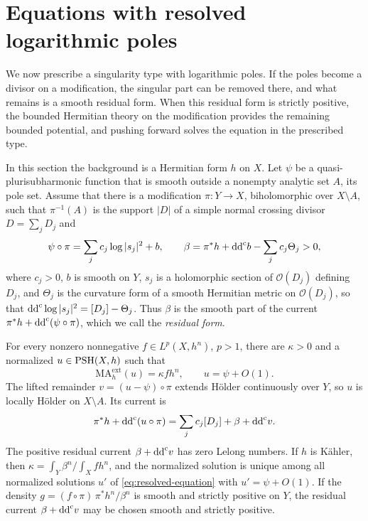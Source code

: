 \section{Equations with resolved logarithmic poles}\label{sec:prescribed}

We now prescribe a singularity type with logarithmic poles. If the poles become a divisor on a modification, the singular part can be removed there, and what remains is a smooth residual form. When this residual form is strictly positive, the bounded Hermitian theory on the modification provides the remaining bounded potential, and pushing forward solves the equation in the prescribed type.

In this section the background is a Hermitian form $h$ on $X$. Let $\psi$ be a quasi-plurisubharmonic function that is smooth outside a nonempty analytic set $A$, its pole set. Assume that there is a modification $\pi\colon Y\to X$, biholomorphic over $X\setminus A$, such that $\pi^{-1}(A)$ is the support $|D|$ of a simple normal crossing divisor $D=\sum_jD_j$ and
\begin{equation}\label{eq:resolved-type}
 \psi\circ\pi=\sum_j c_j\log|s_j|^2+b,
 \qquad
 \beta=\pi^*h+\mathrm{dd}^{\mathrm{c}} b-\sum_jc_j\Theta_j>0,
\end{equation}
where $c_j>0$, $b$ is smooth on $Y$, $s_j$ is a holomorphic section of $\mathcal O(D_j)$ defining $D_j$, and $\Theta_j$ is the curvature form of a smooth Hermitian metric on $\mathcal O(D_j)$, so that $\mathrm{dd}^{\mathrm{c}}\log|s_j|^2=[D_j]-\Theta_j$. Thus $\beta$ is the smooth part of the current $\pi^*h+\mathrm{dd}^{\mathrm{c}}(\psi\circ\pi)$, which we call the \emph{residual form}.

\begin{theorem}\label{thm:resolved-type}
For every nonzero nonnegative $f\in L^p(X,h^n)$, $p>1$, there are $\kappa>0$ and a normalized $u\in\mathrm{PSH}(X,h)$ such that
\begin{equation}\label{eq:resolved-equation}
 \mathrm{MA}^{\mathrm{ext}}_h(u)=\kappa f h^n,
 \qquad u=\psi+O(1).
\end{equation}
The lifted remainder $v=(u-\psi)\circ\pi$ extends H\"older continuously over $Y$, so $u$ is locally H\"older on $X\setminus A$. Its current is
\begin{equation}\label{eq:resolved-current}
 \pi^*h+\mathrm{dd}^{\mathrm{c}}(u\circ\pi)
 =\sum_jc_j[D_j]+\beta+\mathrm{dd}^{\mathrm{c}} v.
\end{equation}
The positive residual current $\beta+\mathrm{dd}^{\mathrm{c}} v$ has zero Lelong numbers. If $h$ is K\"ahler, then $\kappa=\int_Y\beta^n/\int_X f h^n$, and the normalized solution is unique among all normalized solutions $u'$ of \eqref{eq:resolved-equation} with $u'=\psi+O(1)$. If the density $g=(f\circ\pi)\,\pi^*h^n/\beta^n$ is smooth and strictly positive on $Y$, the residual current $\beta+\mathrm{dd}^{\mathrm{c}} v$ may be chosen smooth and strictly positive.
\end{theorem}

